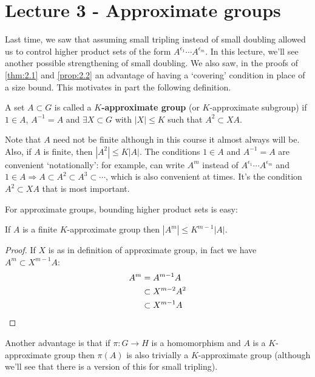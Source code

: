 \documentclass{article}
\numberwithin{equation}{section}
\begin{document}
\clearpage
\section{Lecture 3 - Approximate groups}
Last time, we saw that assuming small tripling instead of small doubling allowed us to control higher product sets of the form $A^{\epsilon_1} \dotsm A^{\epsilon_m}$.
In this lecture, we'll see another possible strengthening of small doubling. We also saw, in the proofs of \cref{thm:2.1} and \cref{prop:2.2} an advantage of having a `covering' condition in place of a size bound. This motivates in part the following definition.
\begin{defi}
  A set $A \subset G$ is called a \textbf{$K$-approximate group} (or $K$-approximate subgroup) if $1 \in A$, $A^{-1} = A$ and $\exists X \subset G$ with $|X| \leq K$ such that $A^2 \subset X A$. %
\end{defi}

Note that $A$ need not be finite although in this course it almost always will be. Also, if $A$ is finite, then $|A^2| \leq K|A|$.
The conditions $1 \in A$ and $A^{-1} = A$ are convenient `notationally': for example, can write $A^m$ instead of $A^{\epsilon_1} \dotsm A^{\epsilon_m}$ and $1 \in A \Rightarrow A \subset A^2 \subset A^3 \subset \dotsb$, which is also convenient at times.
It's the condition $A^2 \subset XA$ that is most important.

For approximate groups, bounding higher product sets is easy:
\begin{nlemma}\label{lem:3.1}
  If $A$ is a finite $K$-approximate group then $|A^m| \leq K^{m-1} |A|$.
\end{nlemma}
\begin{proof}
  If $X$ is as in definition of approximate group, in fact we have $A^m \subset X^{m-1} A$:
  \begin{align*}
    A^m &= A^{m-1} A \\
        &\subset X^{m-2} A^2 \\ %
        &\subset X^{m-1} A \qedhere %
  \end{align*}
\end{proof}
Another advantage is that if $\pi: G \to H$ is a homomorphism and $A$ is a $K$-approximate group then $\pi(A)$ is also trivially a $K$-approximate group (although we'll see that there is a version of this for small tripling).
\end{document}
